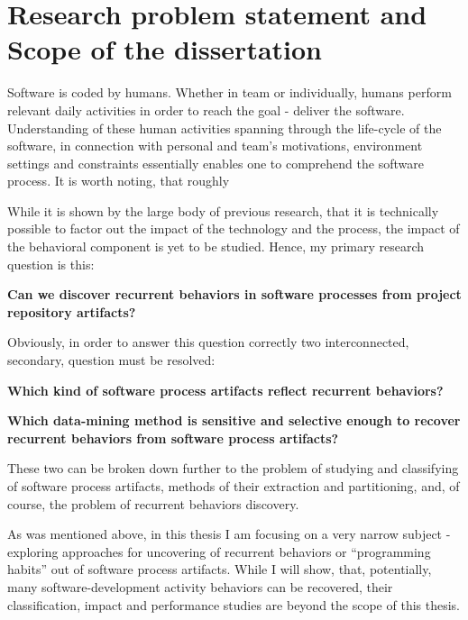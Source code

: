 \section{Research problem statement and Scope of the dissertation}
Software is coded by humans. Whether in team or individually, humans perform relevant 
daily activities in order to reach the goal - deliver the software. Understanding of these
human activities spanning through the life-cycle of the software, in connection with personal 
and team's motivations, environment settings and constraints essentially enables one to
comprehend the software process. It is worth noting, that roughly 



While it is shown by the large body of previous research, that it is technically possible 
to factor out the impact of the technology and the process, the impact of the behavioral 
component is yet to be studied. Hence, my primary research question is this:
\begin{myindentpar}{0.07\linewidth}
 \textbf{Can we discover recurrent behaviors in software processes from project
  repository artifacts?}
\end{myindentpar}

Obviously, in order to answer this question correctly two interconnected, secondary, question must be resolved:
\begin{myindentpar}{0.07\linewidth}
 \textbf{Which kind of software process artifacts reflect recurrent behaviors?}
\end{myindentpar}
\begin{myindentpar}{0.07\linewidth}
 \textbf{Which data-mining method is sensitive and selective enough to recover recurrent behaviors
from software process artifacts?}
\end{myindentpar}
These two can be broken down further to the problem of studying and classifying of software process artifacts,
methods of their extraction and partitioning, and, of course, the problem of recurrent behaviors discovery.

As was mentioned above, in this thesis I am focusing on a very narrow subject - exploring approaches
for uncovering of recurrent behaviors or ``programming habits'' out of software process artifacts.
While I will show, that, potentially, many software-development activity behaviors can be recovered,
their classification, impact and performance studies are beyond the scope of this thesis.


